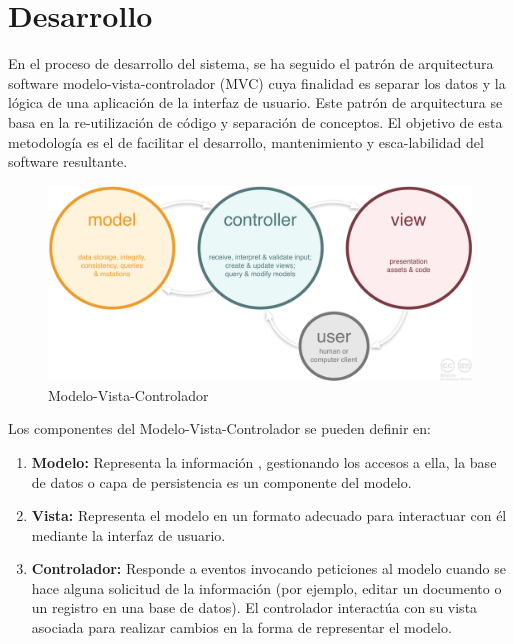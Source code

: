 \documentclass[a4paper,11pt]{book}
\begin{document}
\section{Desarrollo}

En el proceso de desarrollo del sistema, se ha seguido el patrón de arquitectura software modelo-vista-controlador (MVC)\cite{mvc} cuya finalidad es separar los datos y la lógica de una aplicación de la interfaz de usuario. Este patrón de arquitectura se basa en la re-utilización de código y separación de conceptos. El objetivo de esta metodología es el de facilitar el desarrollo, mantenimiento y esca-labilidad del software resultante. 

\begin{figure}[H] 
\centering 
\includegraphics[scale=0.20]{imagenes/mvc.png}
\caption{ Modelo-Vista-Controlador\cite{mvc2}  }  
\end{figure} 

Los componentes\cite{mvc3}\cite{mvc4} del Modelo-Vista-Controlador se pueden definir en:

\begin{enumerate}
\item \textbf{Modelo:} Representa la información , gestionando los accesos a ella, la base de datos  o capa de persistencia es un componente del modelo. 

\item \textbf{Vista:} Representa el modelo en un formato adecuado para interactuar con él mediante la interfaz de usuario.  

\item \textbf{Controlador:} Responde a eventos invocando peticiones al modelo cuando se hace alguna solicitud de la información (por ejemplo, editar un documento o un registro en una base de datos). El controlador interactúa con su vista asociada para realizar cambios en la forma de representar el modelo. 
\end{enumerate}
\end{document}
